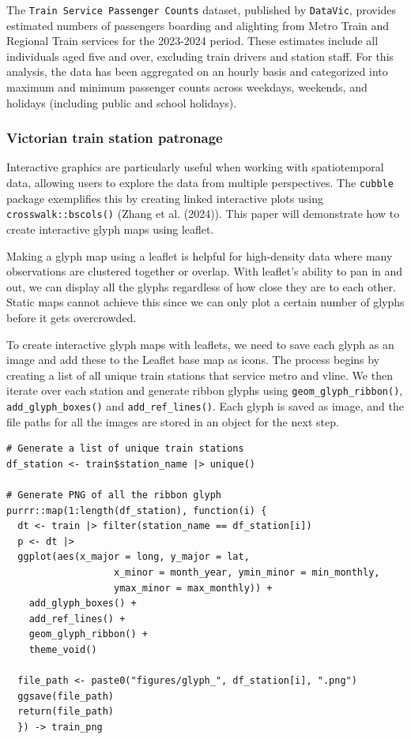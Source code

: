 The \texttt{Train\ Service\ Passenger\ Counts} dataset, published by \texttt{DataVic}, provides estimated numbers of passengers boarding and alighting from Metro Train and Regional Train services for the 2023-2024 period. These estimates include all individuals aged five and over, excluding train drivers and station staff. For this analysis, the data has been aggregated on an hourly basis and categorized into maximum and minimum passenger counts across weekdays, weekends, and holidays (including public and school holidays).

\hypertarget{victorian-train-station-patronage}{%
\subsubsection{Victorian train station patronage}\label{victorian-train-station-patronage}}

Interactive graphics are particularly useful when working with spatiotemporal data, allowing users to explore the data from multiple perspectives. The \texttt{cubble} package exemplifies this by creating linked interactive plots using \texttt{crosswalk::bscols()} (Zhang et al. (2024)). This paper will demonstrate how to create interactive glyph maps using leaflet.

Making a glyph map using a leaflet is helpful for high-density data where many observations are clustered together or overlap. With leaflet's ability to pan in and out, we can display all the glyphs regardless of how close they are to each other. Static maps cannot achieve this since we can only plot a certain number of glyphs before it gets overcrowded.

To create interactive glyph maps with leaflets, we need to save each glyph as an image and add these to the Leaflet base map as icons. The process begins by creating a list of all unique train stations that service metro and vline. We then iterate over each station and generate ribbon glyphs using \texttt{geom\_glyph\_ribbon()}, \texttt{add\_glyph\_boxes()} and \texttt{add\_ref\_lines()}. Each glyph is saved as image, and the file paths for all the images are stored in an object for the next step.

\begin{verbatim}
# Generate a list of unique train stations
df_station <- train$station_name |> unique()

# Generate PNG of all the ribbon glyph
purrr::map(1:length(df_station), function(i) {
  dt <- train |> filter(station_name == df_station[i])
  p <- dt |>
  ggplot(aes(x_major = long, y_major = lat,
                   x_minor = month_year, ymin_minor = min_monthly,
                   ymax_minor = max_monthly)) +
    add_glyph_boxes() +
    add_ref_lines() +
    geom_glyph_ribbon() +
    theme_void() 
  
  file_path <- paste0("figures/glyph_", df_station[i], ".png")
  ggsave(file_path)
  return(file_path)
  }) -> train_png 
\end{verbatim}


